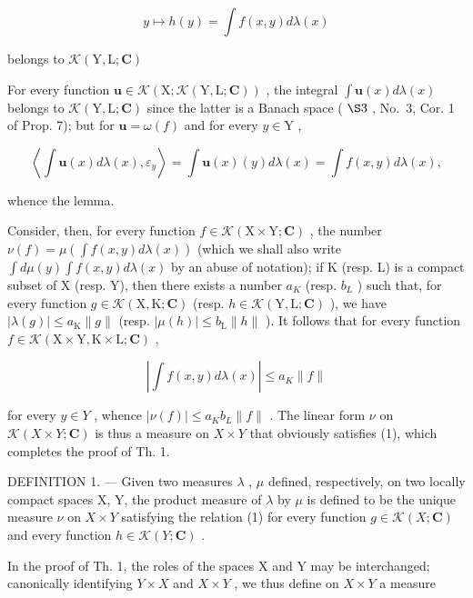 \[
y \mapsto h (y) = \int f (x, y) d \lambda (x)\tag{2}
\]

belongs to \(\mathcal{K}(\mathrm{Y},\mathrm{L};\mathbf{C})\)

For every function \(\mathbf{u} \in \mathcal{K}(\mathrm{X};\mathcal{K}(\mathrm{Y},\mathrm{L};\mathbf{C}))\) , the integral \(\int \mathbf{u}(x)d\lambda (x)\) belongs to \(\mathcal{K}(\mathrm{Y},\mathrm{L};\mathbf{C})\) since the latter is a Banach space ( \(\S 3\) , No.~3, Cor. 1 of Prop. 7); but for \(\mathbf{u} = \omega(f)\) and for every \(y \in \mathrm{Y}\) ,

\[
\left\langle \int \mathbf {u} (x) d \lambda (x), \varepsilon_ {y} \right\rangle = \int \mathbf {u} (x) (y) d \lambda (x) = \int f (x, y) d \lambda (x),
\]

whence the lemma.

Consider, then, for every function \(f \in \mathcal{K}(\mathrm{X} \times \mathrm{Y}; \mathbf{C})\) , the number \(\nu(f) = \mu\left(\int f(x, y) d\lambda(x)\right)\) (which we shall also write \(\int d\mu(y) \int f(x, y) d\lambda(x)\) by an abuse of notation); if K (resp. L) is a compact subset of X (resp. Y), then there exists a number \(a_{K}\) (resp. \(b_{L}\) ) such that, for every function \(g \in \mathcal{K}(\mathrm{X}, \mathrm{K}; \mathbf{C})\) (resp. \(h \in \mathcal{K}(\mathrm{Y}, \mathrm{L}; \mathbf{C})\) ), we have \(|\lambda(g)| \leqslant a_{\mathrm{K}} \|g\|\) (resp. \(|\mu(h)| \leqslant b_{\mathrm{L}} \|h\|\) ). It follows that for every function \(f \in \mathcal{K}(\mathrm{X} \times \mathrm{Y}, \mathrm{K} \times \mathrm{L}; \mathbf{C})\) ,

\[
\left| \int f (x, y) d \lambda (x) \right| \leqslant a _ {K} \| f \|
\]

for every \(y \in Y\) , whence \(|\nu(f)| \leqslant a_{K}b_{L}\|f\|\) . The linear form \(\nu\) on \(\mathcal{K}(X \times Y; \mathbf{C})\) is thus a measure on \(X \times Y\) that obviously satisfies (1), which completes the proof of Th. 1.

DEFINITION 1. --- Given two measures \(\lambda\) , \(\mu\) defined, respectively, on two locally compact spaces X, Y, the product measure of \(\lambda\) by \(\mu\) is defined to be the unique measure \(\nu\) on \(X \times Y\) satisfying the relation (1) for every function \(g \in \mathcal{K}(X; \mathbf{C})\) and every function \(h \in \mathcal{K}(Y; \mathbf{C})\) .

In the proof of Th. 1, the roles of the spaces X and Y may be interchanged; canonically identifying \(Y \times X\) and \(X \times Y\) , we thus define on \(X \times Y\) a measure

